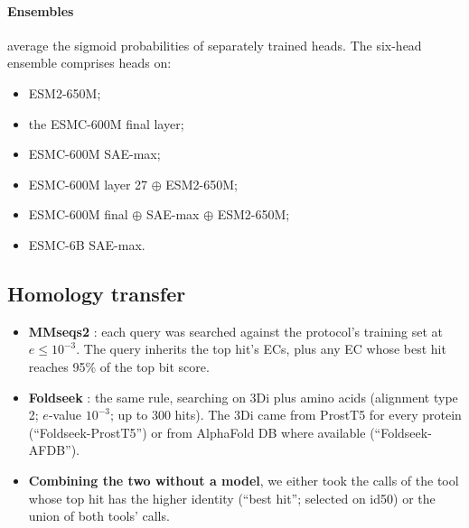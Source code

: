\documentclass[11pt]{article}
\begin{document}
\paragraph{Ensembles} average the sigmoid probabilities of separately trained heads. The six-head ensemble comprises
heads on:
\begin{itemize}
  \item ESM2-650M;
  \item the ESMC-600M final layer;
  \item ESMC-600M SAE-max;
  \item ESMC-600M layer 27 $\oplus$ ESM2-650M;
  \item ESMC-600M final $\oplus$ SAE-max $\oplus$ ESM2-650M;
  \item ESMC-6B SAE-max.
\end{itemize}

\subsection{Homology transfer}
\begin{itemize}
  \item \textbf{MMseqs2} \cite{mmseqs2}: each query was searched against the protocol's training set at
        $e \leq 10^{-3}$. The query inherits the top hit's ECs, plus any EC whose best hit reaches 95\% of the top bit
        score.
  \item \textbf{Foldseek} \cite{foldseek}: the same rule, searching on 3Di plus amino acids (alignment type 2; $e$-value
        $10^{-3}$; up to 300 hits). The 3Di came from ProstT5 for every protein (``Foldseek-ProstT5'') or from AlphaFold
        DB where available (``Foldseek-AFDB'').
  \item \textbf{Combining the two without a model}, we either took the calls of the tool whose top hit has the higher
        identity (``best hit''; selected on id50) or the union of both tools' calls.
\end{itemize}
\end{document}
